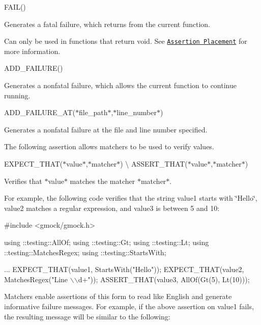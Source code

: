 {\ttfamily F\+A\+I\+L()}

Generates a fatal failure, which returns from the current function.

Can only be used in functions that return {\ttfamily void}. See \href{../advanced.md#assertion-placement}{\tt Assertion Placement} for more information.

{\ttfamily A\+D\+D\+\_\+\+F\+A\+I\+L\+U\+R\+E()}

Generates a nonfatal failure, which allows the current function to continue running.

{\ttfamily A\+D\+D\+\_\+\+F\+A\+I\+L\+U\+R\+E\+\_\+\+AT(}$\ast${\ttfamily file\+\_\+path}$\ast${\ttfamily ,}$\ast${\ttfamily line\+\_\+number}$\ast${\ttfamily )}

Generates a nonfatal failure at the file and line number specified.

The following assertion allows matchers to be used to verify values.

{\ttfamily E\+X\+P\+E\+C\+T\+\_\+\+T\+H\+AT(}$\ast${\ttfamily value}$\ast${\ttfamily ,}$\ast${\ttfamily matcher}$\ast${\ttfamily )} \textbackslash{} {\ttfamily A\+S\+S\+E\+R\+T\+\_\+\+T\+H\+AT(}$\ast${\ttfamily value}$\ast${\ttfamily ,}$\ast${\ttfamily matcher}$\ast${\ttfamily )}

Verifies that $\ast${\ttfamily value}$\ast$ matches the matcher $\ast${\ttfamily matcher}$\ast$.

For example, the following code verifies that the string {\ttfamily value1} starts with {\ttfamily \char`\"{}\+Hello\char`\"{}}, {\ttfamily value2} matches a regular expression, and {\ttfamily value3} is between 5 and 10\+:


\begin{DoxyCode}
\textcolor{preprocessor}{#include <gmock/gmock.h>}

using ::testing::AllOf;
using ::testing::Gt;
using ::testing::Lt;
using ::testing::MatchesRegex;
using ::testing::StartsWith;

...
EXPECT\_THAT(value1, StartsWith(\textcolor{stringliteral}{"Hello"}));
EXPECT\_THAT(value2, MatchesRegex(\textcolor{stringliteral}{"Line \(\backslash\)\(\backslash\)d+"}));
ASSERT\_THAT(value3, AllOf(Gt(5), Lt(10)));
\end{DoxyCode}


Matchers enable assertions of this form to read like English and generate informative failure messages. For example, if the above assertion on {\ttfamily value1} fails, the resulting message will be similar to the following\+:


